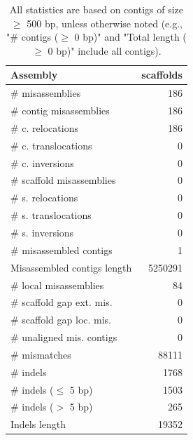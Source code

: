 \documentclass[12pt,a4paper]{article}
\begin{document}
\begin{table}[ht]
\begin{center}
\caption{All statistics are based on contigs of size $\geq$ 500 bp, unless otherwise noted (e.g., "\# contigs ($\geq$ 0 bp)" and "Total length ($\geq$ 0 bp)" include all contigs).}
\begin{tabular}{|l*{1}{|r}|}
\hline
Assembly & scaffolds \\ \hline
\# misassemblies & 186 \\ \hline
\hspace{2mm}\# contig misassemblies & 186 \\ \hline
\hspace{5mm}\# c. relocations & 186 \\ \hline
\hspace{5mm}\# c. translocations & 0 \\ \hline
\hspace{5mm}\# c. inversions & 0 \\ \hline
\hspace{2mm}\# scaffold misassemblies & 0 \\ \hline
\hspace{5mm}\# s. relocations & 0 \\ \hline
\hspace{5mm}\# s. translocations & 0 \\ \hline
\hspace{5mm}\# s. inversions & 0 \\ \hline
\# misassembled contigs & 1 \\ \hline
Misassembled contigs length & 5250291 \\ \hline
\# local misassemblies & 84 \\ \hline
\# scaffold gap ext. mis. & 0 \\ \hline
\# scaffold gap loc. mis. & 0 \\ \hline
\# unaligned mis. contigs & 0 \\ \hline
\# mismatches & 88111 \\ \hline
\# indels & 1768 \\ \hline
\hspace{5mm}\# indels ($\leq$ 5 bp) & 1503 \\ \hline
\hspace{5mm}\# indels ($>$ 5 bp) & 265 \\ \hline
Indels length & 19352 \\ \hline
\end{tabular}
\end{center}
\end{table}
\end{document}
